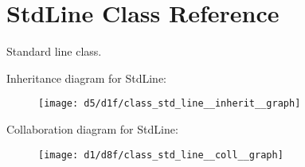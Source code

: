 \hypertarget{class_std_line}{}\section{Std\+Line Class Reference}
\label{class_std_line}


Standard line class.  




Inheritance diagram for Std\+Line\+:
\nopagebreak
\begin{figure}[H]
\begin{center}
\leavevmode
\texttt{[image: d5/d1f/class\_std\_line\_\_inherit\_\_graph]}
\end{center}
\end{figure}


Collaboration diagram for Std\+Line\+:
\nopagebreak
\begin{figure}[H]
\begin{center}
\leavevmode
\texttt{[image: d1/d8f/class\_std\_line\_\_coll\_\_graph]}
\end{center}
\end{figure}
